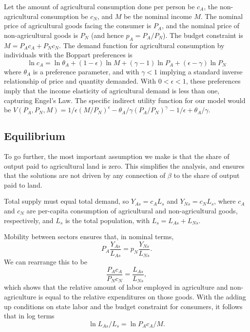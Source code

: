 \documentclass[11pt]{article}
\begin{document}
Let the amount of agricultural consumption done per person be $c_A$, the non-agricultural consumption be $c_N$, and $M$ be the nominal income $M$. The nominal price of agricultural goods facing the consumer is $P_A$, and the nominal price of non-agricultural goods is $P_N$ (and hence $p_A = P_A/P_N$). The budget constraint is $M = P_A c_A + P_N c_N$. The demand function for agricultural consumption by individuals with the Boppart preferences is
\begin{equation}
    \ln c_A = \ln \theta_A + (1-\epsilon) \ln M + (\gamma - 1) \ln P_A + (\epsilon - \gamma) \ln P_N \label{EQ_ca_demand}
\end{equation}
where $\theta_A$ is a preference parameter, and with $\gamma<1$ implying a standard inverse relationship of price and quantity demanded. With $0 < \epsilon < 1$, these preferences imply that the income elasticity of agricultural demand is less than one, capturing Engel's Law. The specific indirect utility function for our model would be $V(P_A,P_N,M) = 1/\epsilon \left(M/P_N\right)^{\epsilon} - \theta_A/\gamma \left(P_A/P_N\right)^{\gamma} - 1/\epsilon + \theta_A/\gamma$.

\subsection{Equilibrium}
To go further, the most important assumption we make is that the share of output paid to agricultural land is zero. This simplifies the analysis, and ensures that the solutions are not driven by any connection of $\beta$ to the share of output paid to land. 

Total supply must equal total demand, so $Y_{As} = c_A L_s$ and $Y_{Ns} = c_N L_s$, where $c_A$ and $c_N$ are per-capita consumption of agricultural and non-agricultural goods, respectively, and $L_s$ is the total population, with $L_s = L_{As} + L_{Ns}$.

Mobility between sectors ensures that, in nominal terms,
\begin{equation}
    P_A \frac{Y_{As}}{L_{As}} = p_N \frac{Y_{Ns}}{L_{Ns}}. \label{EQ_mobility}
\end{equation}
We can rearrange this to be
\begin{equation}
    \frac{P_A c_A}{P_N c_N} = \frac{L_{As}}{L_{Ns}}, \label{EQ_expend}
\end{equation}
which shows that the relative amount of labor employed in agriculture and non-agriculture is equal to the relative expenditures on those goods. With the adding up conditions on state labor and the budget constraint for consumers, it follows that in log terms
\begin{equation}
    \ln L_{As}/L_s = \ln P_A c_A/M. \label{EQ_pacaM}
\end{equation}
\end{document}
